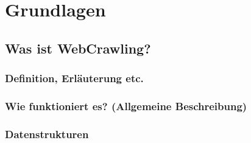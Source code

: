\documentclass[a4paper,oneside,12pt]{report}
\begin{document}
	
	


	\chapter{Grundlagen}\label{grlagen}
	
		\section{Was ist WebCrawling?}
	
			\subsection{Definition, Erläuterung etc.}
	
			\subsection{Wie funktioniert es? (Allgemeine Beschreibung)}
	
			\subsection{Datenstrukturen}
			
\end{document}
